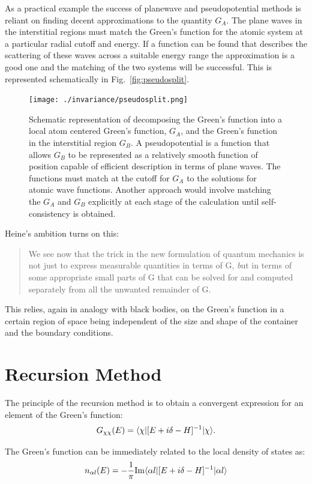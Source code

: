 As a practical example the success of planewave and pseudopotential methods 
is reliant on finding decent approximations to the quantity $G_{A}$. The plane waves
in the interstitial regions must match the Green's function for the atomic system
at a particular radial cutoff and energy. If a function can be found that 
describes the scattering of these waves across a suitable energy range the approximation 
is a good one and the matching of the two systems will be successful. This
is represented schematically in Fig.~\ref{fig:pseudosplit}.
%
\begin{figure}
\begin{center}
\texttt{[image: ./invariance/pseudosplit.png]}
\caption{Schematic representation of decomposing the Green's function into a local atom centered
Green's function, $G_{A}$, and the Green's function in the interstitial region $G_{B}$.
A pseudopotential is a function that allows $G_{B}$ to be represented as a relatively
smooth function of position capable of efficient description in terms of plane waves.
The functions must match at the cutoff for $G_{A}$ to the solutions for 
atomic wave functions. Another approach would involve matching the $G_{A}$ 
and $G_{B}$ explicitly at each stage of the calculation until self-consistency is obtained.}
\end{center}
\end{figure}
%
Heine's ambition turns on this:
%
\begin{quote}
We see now that the trick in the new formulation of quantum 
mechanics is not just to express measurable quantities in terms of 
G, {\emph but in terms of some appropriate small parts of G that can be solved 
for and computed separately from all the unwanted remainder of G.}
\end{quote}
%
This relies, again in analogy with black bodies, on the Green's
function in a certain region of space being independent of the size and shape
of the container and the boundary conditions.


\section{Recursion Method}
The principle of the recursion method is to obtain a convergent expression 
for an element of the Green's function:
%
\begin{equation}
G_{\chi\chi}(E) = \langle\chi|[E + i\delta -H]^{-1}|\chi\rangle.
\end{equation}
%

The Green's function can be immediately related to the local density of states as:
%
\begin{equation}
n_{\alpha l}(E) = -\frac{1}{\pi} {\rm Im}\langle\alpha l|[E + i\delta -H]^{-1}|\alpha l\rangle
\end{equation}
%

